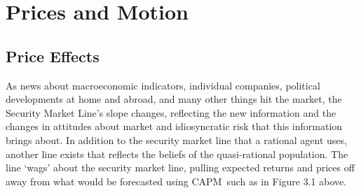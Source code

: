 \documentclass{ucthesis}
\begin{document}
\section{Prices and Motion}

\subsection{Price Effects}

As news about macroeconomic indicators, individual companies, political
developments at home and abroad, and many other things hit the market, the
Security Market Line's slope changes, reflecting the new information and the
changes in attitudes about market and idiosyncratic risk that this
information brings about. In addition to the security market line that a
rational agent uses, another line exists that reflects the beliefs of the
quasi-rational population. The line `wags' about the security market line,
pulling expected returns and prices off away from what would be forecasted
using CAPM\textrm{\ }such as in Figure 3.1 above.

\end{document}
